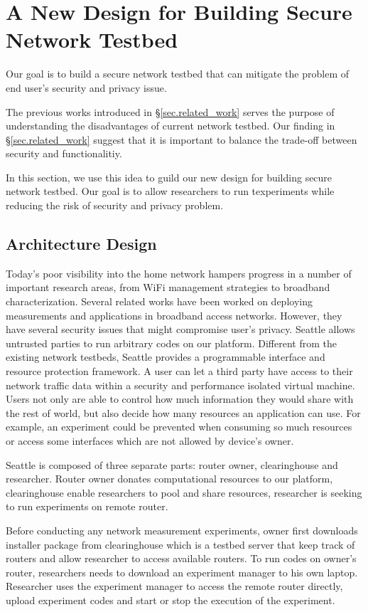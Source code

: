 \section{A New Design for Building Secure Network Testbed}
\label{sec.design}
Our goal is to build a secure network testbed that can mitigate the problem 
of end user's security and privacy issue. 

The previous works introduced in \S{\ref{sec.related_work}} serves the 
purpose of understanding the disadvantages of current network testbed. Our 
finding in \S{\ref{sec.related_work}} suggest that it is important to 
balance the trade-off between security and functionalitiy.

In this section, we use this idea to guild our new design for building 
secure network testbed. Our goal is to allow researchers to run texperiments 
while reducing the risk of security and privacy problem.

\subsection{Architecture Design}
Today's poor visibility into the home network hampers progress in a number 
of important research areas, from WiFi management strategies to broadband 
characterization. Several related works have been worked on deploying 
measurements and applications in broadband access networks. However, they 
have several security issues that might compromise user's privacy. Seattle 
allows untrusted parties to run arbitrary codes on our platform. Different 
from the existing network testbeds, Seattle provides a programmable 
interface and resource protection framework. A user can let a third party 
have access to their network traffic data within a security and performance 
isolated virtual machine. Users not only are able to control how much 
information they would share with the rest of world, but also decide how 
many resources an application can use. For example, an experiment could be 
prevented when consuming so much resources or access some interfaces which 
are not allowed by device's owner. 

Seattle is composed of three separate parts: router owner, clearinghouse and 
researcher. Router owner donates computational resources to our platform, 
clearinghouse enable researchers to pool and share resources, researcher is 
seeking to run experiments on remote router.

Before conducting any network measurement experiments, owner first downloads 
installer package from clearinghouse which is a testbed server that keep 
track of routers and allow researcher to access available routers. To run 
codes on owner's router, researchers needs to download an experiment manager 
to his own laptop. Researcher uses the experiment manager to access the 
remote router directly, upload experiment codes and start or stop the 
execution of the experiment.

